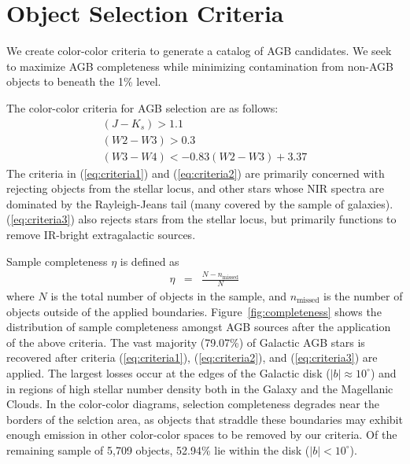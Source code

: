 \section{Object Selection Criteria}
\label{sec:criteria}
We create color-color criteria to generate a catalog of AGB candidates. We seek to maximize AGB completeness while minimizing contamination from non-AGB objects to beneath the 1\% level.

The color-color criteria for AGB selection are as follows:
\begin{align} 
(J-K_s) > 1.1\label{eq:criteria1}\\
(W2-W3) > 0.3\label{eq:criteria2}\\
(W3-W4) < -0.83(W2-W3) + 3.37\label{eq:criteria3}
\end{align}
The criteria in (\ref{eq:criteria1}) and (\ref{eq:criteria2}) are primarily concerned with rejecting objects from the stellar locus, and other stars whose NIR spectra are dominated by the Rayleigh-Jeans tail (many covered by the sample of galaxies). (\ref{eq:criteria3}) also rejects stars from the stellar locus, but primarily functions to remove IR-bright extragalactic sources.

\noindent Sample completeness $\eta$ is defined as
\begin{eqnarray*}
\eta &=& \frac{N - n_\text{missed}}{N}
\end{eqnarray*}
where $N$ is the total number of objects in the sample, and $n_\text{missed}$ is the number of objects outside of the applied boundaries. Figure~\ref{fig:completeness} shows the distribution of sample completeness amongst AGB sources after the application of the above criteria. The vast majority (79.07\%) of Galactic AGB stars is recovered after criteria (\ref{eq:criteria1}), (\ref{eq:criteria2}), and (\ref{eq:criteria3}) are applied. The largest losses occur at the edges of the Galactic disk ($\lvert b\rvert\approx10^\circ$) and in regions of high stellar number density both in the Galaxy and the Magellanic Clouds. In the color-color diagrams, selection completeness degrades near the borders of the selction area, as objects that straddle these boundaries may exhibit enough emission in other color-color spaces to be removed by our criteria. Of the remaining sample of 5,709 objects, 52.94\% lie within the disk ($\lvert b\rvert<10^\circ$).

